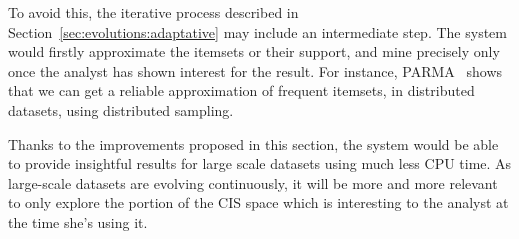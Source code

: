 To avoid this, the iterative process described in Section~\ref{sec:evolutions:adaptative} may include an intermediate step.
The system would firstly approximate the itemsets or their support,
and mine precisely only once the analyst has shown interest for the result.
For instance, PARMA~\cite{RiondatoCIKM12} shows that we can get a reliable approximation of frequent itemsets,
in distributed datasets, using distributed sampling.



\begin{paragraph}{}
	Thanks to the improvements proposed in this section,
	the system would be able to provide insightful results for large scale datasets
	using much less CPU time.
	As large-scale datasets are evolving continuously,
	it will be more and more relevant to only explore the portion of the CIS space which is interesting to the analyst at the time she's using it.
\end{paragraph}
